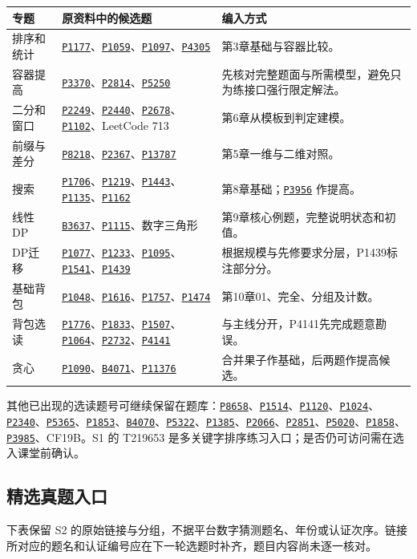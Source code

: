 \documentclass[UTF8,11pt,a4paper,fontset=none]{ctexart}
\newcommand{\prob}[1]{\href{https://www.luogu.com.cn/problem/#1}{\texttt{#1}}}
\begin{document}
\begin{longtable}{P{2.5cm}P{7.2cm}P{5.1cm}}
\toprule 专题 & 原资料中的候选题 & 编入方式 \\\midrule\endhead
排序和统计 & \prob{P1177}、\prob{P1059}、\prob{P1097}、\prob{P4305} & 第3章基础与容器比较。\\
容器提高 & \prob{P3370}、\prob{P2814}、\prob{P5250} & 先核对完整题面与所需模型，避免只为练接口强行限定解法。\\
二分和窗口 & \prob{P2249}、\prob{P2440}、\prob{P2678}、\prob{P1102}、LeetCode 713 & 第6章从模板到判定建模。\\
前缀与差分 & \prob{P8218}、\prob{P2367}、\prob{P13787} & 第5章一维与二维对照。\\
搜索 & \prob{P1706}、\prob{P1219}、\prob{P1443}、\prob{P1135}、\prob{P1162} & 第8章基础；\prob{P3956} 作提高。\\
线性DP & \prob{B3637}、\prob{P1115}、数字三角形 & 第9章核心例题，完整说明状态和初值。\\
DP迁移 & \prob{P1077}、\prob{P1233}、\prob{P1095}、\prob{P1541}、\prob{P1439} & 根据规模与先修要求分层，P1439标注部分分。\\
基础背包 & \prob{P1048}、\prob{P1616}、\prob{P1757}、\prob{P1474} & 第10章01、完全、分组及计数。\\
背包选读 & \prob{P1776}、\prob{P1833}、\prob{P1507}、\prob{P1064}、\prob{P2732}、\prob{P4141} & 与主线分开，P4141先完成题意勘误。\\
贪心 & \prob{P1090}、\prob{B4071}、\prob{P11376} & 合并果子作基础，后两题作提高候选。\\
\bottomrule
\end{longtable}

其他已出现的选读题号可继续保留在题库：\prob{P8658}、\prob{P1514}、\prob{P1120}、\prob{P1024}、\prob{P2340}、\prob{P5365}、\prob{P1853}、\prob{B4070}、\prob{P5322}、\prob{P1385}、\prob{P2066}、\prob{P2851}、\prob{P5020}、\prob{P1858}、\prob{P3985}、CF19B。S1 的 T219653 是多关键字排序练习入口；是否仍可访问需在选入课堂前确认。

\subsection{精选真题入口}
下表保留 S2 的原始链接与分组，不据平台数字猜测题名、年份或认证次序。链接所对应的题名和认证编号应在下一轮选题时补齐，题目内容尚未逐一核对。
\end{document}
